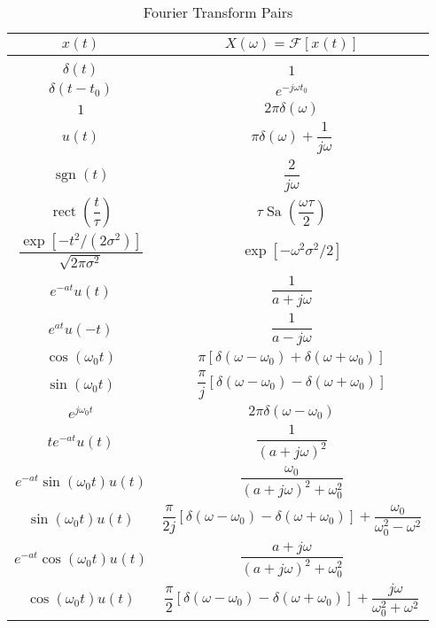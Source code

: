 \documentclass{report}
\begin{document}
\begin{table}
    \centering
    \caption{Fourier Transform Pairs}
    \label{fourier_pairs}
    \begin{tabular}{|c|c|}
        \hline
        $x(t)$ & $X(\omega)=\mathcal{F}[x(t)]$ \\[0.15cm]
        \hline
        & \\[0.1cm]
        $\delta(t)$ & $1$ \\[0.5cm]
        $\delta(t-t_0)$ & $e^{-j\omega t_0}$ \\[0.5cm]
        $1$ & $2\pi\delta(\omega)$ \\[0.5cm]
        $u(t)$ & $\pi\delta(\omega) + \dfrac{1}{j\omega}$ \\[0.5cm]
        $\operatorname{sgn}(t)$ & $\dfrac{2}{j\omega}$ \\[0.5cm]
        $\operatorname{rect}\left(\dfrac{t}{\tau}\right)$ & $\tau\operatorname{Sa}\left(\dfrac{\omega\tau}{2}\right)$ \\[0.5cm]
        $\dfrac{\exp[-t^2/(2\sigma^2)]}{\sqrt{2\pi\sigma^2}}$ & $\exp[-\omega^2\sigma^2/2]$ \\[0.5cm]
        $e^{-at}u(t)$ & $\dfrac{1}{a+j\omega}$ \\[0.5cm]
        $e^{at}u(-t)$ & $\dfrac{1}{a-j\omega}$ \\[0.5cm]
        $\cos(\omega_0 t)$ & $\pi[\delta(\omega-\omega_0) + \delta(\omega+\omega_0)]$ \\[0.5cm]
        $\sin(\omega_0 t)$ & $\dfrac{\pi}{j}[\delta(\omega-\omega_0) - \delta(\omega+\omega_0)]$ \\[0.5cm]
        $e^{j\omega_0 t}$ & $2\pi\delta(\omega-\omega_0)$ \\[0.5cm]
        $te^{-at}u(t)$ & $\dfrac{1}{(a+j\omega)^2}$ \\[0.5cm]
        $e^{-at}\sin(\omega_0 t)u(t)$ & $\dfrac{\omega_0}{(a+j\omega)^2+\omega_0^2}$ \\[0.5cm]
        $\sin(\omega_0 t)u(t)$ & $\dfrac{\pi}{2j}[\delta(\omega-\omega_0) - \delta(\omega+\omega_0)] + \dfrac{\omega_0}{\omega_0^2-\omega^2}$ \\[0.5cm]
        $e^{-at}\cos(\omega_0 t)u(t)$ & $\dfrac{a+j\omega}{(a+j\omega)^2+\omega_0^2}$ \\[0.5cm]
        $\cos(\omega_0 t)u(t)$ & $\dfrac{\pi}{2}[\delta(\omega-\omega_0) - \delta(\omega+\omega_0)] + \dfrac{j\omega}{\omega_0^2+\omega^2}$ \\[0.5cm]
        \hline
    \end{tabular}
\end{table}
\end{document}
